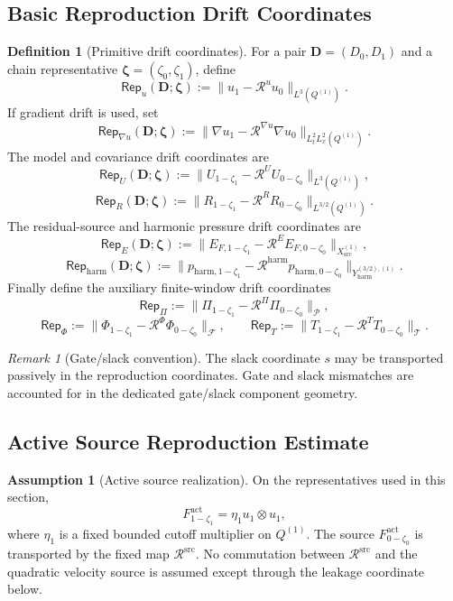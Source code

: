 \documentclass[11pt]{article}
\numberwithin{equation}{section}
\theoremstyle{definition}
\newtheorem{definition}[definition]{Definition}
\newtheorem{assumption}[assumption]{Assumption}
\theoremstyle{remark}
\newtheorem{remark}[remark]{Remark}
\newcommand{\harm}{\mathrm{harm}}
\newcommand{\src}{\mathrm{src}}
\newcommand{\Rep}{\mathsf{Rep}}
\newcommand{\calR}{\mathcal R}
\newcommand{\bD}{\mathbf D}
\newcommand{\bzeta}{\boldsymbol\zeta}
\newcommand{\Xsrc}{X_{\src}}
\begin{document}
\subsection{Basic Reproduction Drift Coordinates}
\label{rep:sec:basic-drift}

\begin{definition}[Primitive drift coordinates]
\label{rep:def:primitive-drift-coordinates}
For a pair \(\bD=(D_0,D_1)\) and a chain representative
\(\bzeta=(\zeta_0,\zeta_1)\), define
\[
    \Rep_u(\bD;\bzeta)
    :=
    \|u_1-\calR^u u_0\|_{L^3(Q^{(1)})}.
\]
If gradient drift is used, set
\[
    \Rep_{\nabla u}(\bD;\bzeta)
    :=
    \|\nabla u_1-\calR^{\nabla u}\nabla u_0\|_{L^2_tL^2_x(Q^{(1)})}.
\]
The model and covariance drift coordinates are
\[
    \Rep_U(\bD;\bzeta)
    :=
    \|U_{1-\zeta_1}-\calR^U U_{0-\zeta_0}\|_{L^3(Q^{(1)})},
\]
\[
    \Rep_R(\bD;\bzeta)
    :=
    \|R_{1-\zeta_1}-\calR^R R_{0-\zeta_0}\|_{L^{3/2}(Q^{(1)})}.
\]
The residual-source and harmonic pressure drift coordinates are
\[
    \Rep_E(\bD;\bzeta)
    :=
    \|E_{F,1-\zeta_1}-\calR^E E_{F,0-\zeta_0}\|_{\Xsrc^{(1)}},
\]
\[
    \Rep_{\harm}(\bD;\bzeta)
    :=
    \|p_{\harm,1-\zeta_1}
    -
    \calR^{\harm}p_{\harm,0-\zeta_0}\|_{Y_{\harm}^{(3/2),(1)}}.
\]
Finally define the auxiliary finite-window drift coordinates
\[
    \Rep_{\Pi}:=\|\Pi_{1-\zeta_1}-\calR^\Pi\Pi_{0-\zeta_0}\|_{\mathcal P},
\]
\[
    \Rep_{\Phi}:=\|\Phi_{1-\zeta_1}-\calR^\Phi\Phi_{0-\zeta_0}\|_{\mathcal F},
    \qquad
    \Rep_T:=\|T_{1-\zeta_1}-\calR^T T_{0-\zeta_0}\|_{\mathcal T}.
\]
\end{definition}

\begin{remark}[Gate/slack convention]
The slack coordinate \(s\) may be transported passively in the reproduction
coordinates.  Gate and slack mismatches are accounted for in the dedicated
gate/slack component geometry.
\end{remark}

\subsection{Active Source Reproduction Estimate}
\label{rep:sec:active-source}

\begin{assumption}[Active source realization]
\label{rep:ass:active-source-realization}
On the representatives used in this section,
\[
    F^{\mathrm{act}}_{1-\zeta_1}
    =
    \eta_1 u_1\otimes u_1,
\]
where \(\eta_1\) is a fixed bounded cutoff multiplier on \(Q^{(1)}\).  The
source \(F^{\mathrm{act}}_{0-\zeta_0}\) is transported by the fixed map
\(\calR^{\src}\).  No commutation between \(\calR^{\src}\) and the quadratic
velocity source is assumed except through the leakage coordinate below.
\end{assumption}
\end{document}
